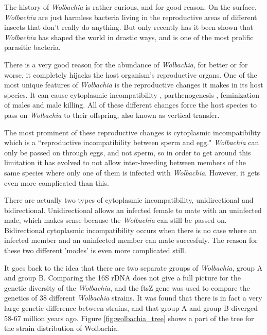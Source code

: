 \documentclass[twocolumn]{article}
\begin{document}
The history of \textit{Wolbachia} is rather curious, and for good reason. On the surface, \textit{Wolbachia} are just harmless bacteria living in the reproductive areas of different insects that don't really do anything. But only recently has it been shown that \textit{Wolbachia} has shaped the world in drastic ways, and is one of the most prolific parasitic bacteria.\cite{Wdistr}

There is a very good reason for the abundance of \textit{Wolbachia}, for better or for worse, it completely hijacks the host organism's reproductive organs. One of the most unique features of \textit{Wolbachia} is the reproductive changes it makes in its host species. It can cause cytoplasmic incompatibility \cite{Wci0}\cite{Wci1}\cite{Wci2}\cite{Wci3}, parthenogenesis \cite{Wparth}, feminization of males \cite{Wfem} and male killing.\cite{Wmale_killing} All of these different changes force the host species to pass on \textit{Wolbachia} to their offspring, also known as vertical transfer.

The most prominent of these reproductive changes is cytoplasmic incompatibility which is a ``reproductive incompatibility between sperm and egg."\cite{Wbio} \textit{Wolbachia} can only be passed on through eggs, and not sperm, so in order to get around this limitation it has evolved to not allow inter-breeding between members of the same species where only one of them is infected with \textit{Wolbachia}. However, it gets even more complicated than this.

There are actually two types of cytoplasmic incompatibility, unidirectional and bidirectional. Unidirectional allows an infected female to mate with an uninfected male, which makes sense because the \textit{Wolbachia} can still be passed on. Bidirectional cytoplasmic incompatibility occurs when there is no case where an infected member and an uninfected member can mate succesfuly. The reason for these two different 'modes' is even more complicated still.

It goes back to the idea that there are two separate groups of \textit{Wolbachia}, group A and group B. Comparing the 16S rDNA does not give a full picture for the genetic diversity of the \textit{Wolbachia}, and the ftsZ gene was used to compare the genetics of 38 different \textit{Wolbachia} strains.\cite{Wgenetics} It was found that there is in fact a very large genetic difference between strains, and that group A and group B diverged 58-67 million years ago. Figure \ref{fig:wolbachia_tree} shows a part of the tree for the strain distribution of Wolbachia.
\end{document}
